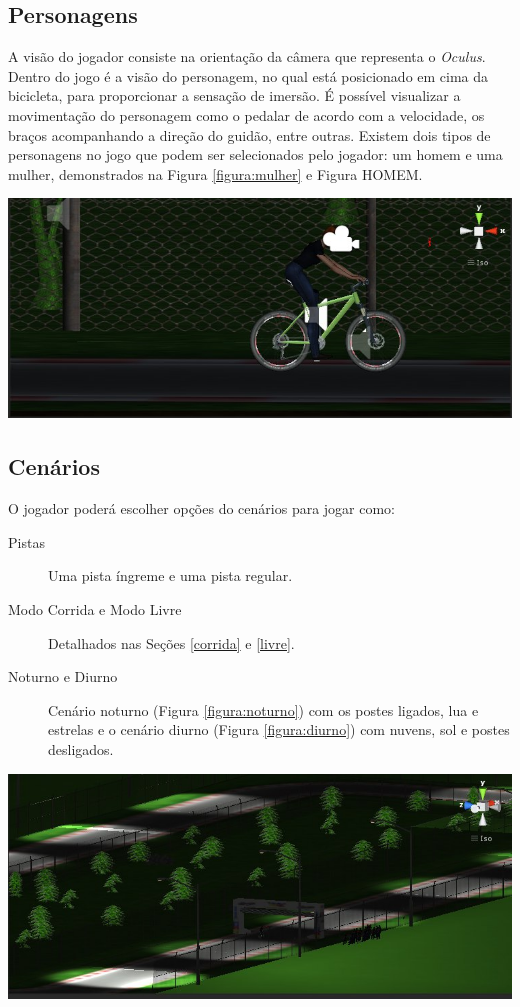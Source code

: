 \subsection{Personagens}
A visão do jogador consiste na orientação da câmera que representa o \textit{Oculus}. Dentro do jogo é a visão do personagem, no qual está posicionado em cima da bicicleta, para proporcionar a sensação de imersão. É possível visualizar a movimentação do personagem como o pedalar de acordo com a velocidade, os braços acompanhando a direção do guidão, entre outras. Existem dois tipos de personagens no jogo que podem ser selecionados pelo jogador: um homem e uma mulher, demonstrados na Figura \ref{figura:mulher} e Figura HOMEM.

\begin{center}
	\includegraphics[scale=0.4]{figuras/mulher}
	\label{figura:mulher}
\end{center}

\subsection{Cenários}

O jogador poderá escolher opções do cenários para jogar como:

\begin{description}
\item[Pistas] Uma pista íngreme e uma pista regular.
\item[Modo Corrida e Modo Livre] Detalhados nas Seções \ref{corrida} e \ref{livre}.
\item[Noturno e Diurno] Cenário noturno (Figura \ref{figura:noturno}) com os postes ligados, lua e estrelas e o cenário diurno (Figura \ref{figura:diurno}) com nuvens, sol e postes desligados.
\end{description}

\begin{center}
	\includegraphics[scale=0.4]{figuras/noturno}
	\label{figura:noturno}
\end{center}

